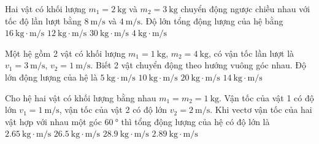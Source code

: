 \begin{ex}
	Hai vật có khối lượng $m_1=\SI{2}{\kilogram}$ và $m_2=\SI{3}{\kilogram}$ chuyển động ngược chiều nhau với tốc độ lần lượt bằng $\SI{8}{\meter/\second}$ và $\SI{4}{\meter/\second}$. Độ lớn tổng động lượng của hệ bằng
	\choice
	{$\SI{16}{\kilogram\cdot\meter/\second}$}
	{$\SI{12}{\kilogram\cdot\meter/\second}$}
	{$\SI{30}{\kilogram\cdot\meter/\second}$}
	{\True $\SI{4}{\kilogram\cdot\meter/\second}$}
\end{ex}
\begin{ex}
	Một hệ gồm 2 vật có khối lượng $m_1 = \SI{1}{\kilogram}$, $m_2 =\SI{4}{\kilogram}$, có vận tốc lần lượt là $v_1 = \SI{3}{\meter/\second}$, $v_2=\SI{1}{\meter/\second}$. Biết 2 vật chuyển động theo hướng vuông góc nhau. Độ lớn động lượng của hệ là
	\choice
	{\True $\SI{5}{\kilogram\cdot\meter/\second}$}
	{$\SI{10}{\kilogram\cdot\meter/\second}$}
	{$\SI{20}{\kilogram\cdot\meter/\second}$}
	{$\SI{14}{\kilogram\cdot\meter/\second}$}
\end{ex}
\begin{ex}
Cho hệ hai vật có khối lượng bằng nhau $m_1 = m_2 =\SI{1}{\kilogram}$. Vận tốc của vật 1 có độ lớn $v_1 =\SI{1}{\meter/\second}$, vận tốc của vật 2 có độ lớn $v_2 =\SI{2}{\meter/\second}$. Khi vectơ vận tốc của hai vật hợp với nhau một góc $\SI{60}{\degree}$ thì tổng động lượng của hệ có độ lớn là	
	\choice
	{\True $\SI{2.65}{\kilogram\cdot\meter/\second}$}
	{$\SI{26.5}{\kilogram\cdot\meter/\second}$}
	{$\SI{28.9}{\kilogram\cdot\meter/\second}$}
	{$\SI{2.89}{\kilogram\cdot\meter/\second}$}
\end{ex}
